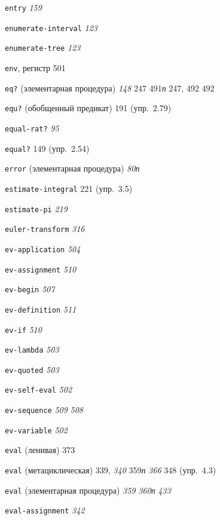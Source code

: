 \begin{theindex}
\item {\texttt{entry}} {\it 159}
\item {\texttt{enumerate-interval}} {\it 123}
\item {\texttt{enumerate-tree}} {\it 123}
\item {\texttt{env}, регистр} 501
\item {\texttt{eq?} (элементарная процедура)} {\it 148}
   247
   491{\it п}
   247, 492
   492
\item {\texttt{equ?} (обобщенный предикат)} 191 (упр.~2.79)
\item {\texttt{equal-rat?}} {\it 95}
\item {\texttt{equal?}} 149 (упр.~2.54)
\item {\texttt{error} (элементарная процедура)} {\it 80}{\it п}
\item {\texttt{estimate-integral}} 221 (упр.~3.5)
\item {\texttt{estimate-pi}} {\it 219}
\item {\texttt{euler-transform}} {\it 316}
\item {\texttt{ev-application}} {\it 504}
\item {\texttt{ev-assignment}} {\it 510}
\item {\texttt{ev-begin}} {\it 507}
\item {\texttt{ev-definition}} {\it 511}
\item {\texttt{ev-if}} {\it 510}
\item {\texttt{ev-lambda}} {\it 503}
\item {\texttt{ev-quoted}} {\it 503}
\item {\texttt{ev-self-eval}} {\it 502}
\item {\texttt{ev-sequence}}
   {\it 509}
   {\it 508}
\item {\texttt{ev-variable}} {\it 502}
\item {\texttt{eval} (ленивая)} 373
\item {\texttt{eval} (метациклическая)} 339, {\it 340}
   359{\it п}
   {\it 366}
   348 (упр.~4.3)
\item {\texttt{eval} (элементарная процедура)} {\it 359}
   {\it 360}{\it п}
   {\it 433}
\item {\texttt{eval-assignment}} {\it 342}

\end{theindex}
